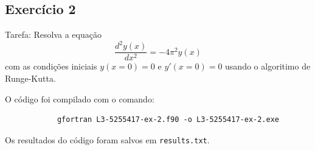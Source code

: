 \documentclass[12pt, a4paper]{article} %
\begin{document}
    \subsection{Exerc\'icio 2}

        Tarefa: Resolva a equa\c{c}\~ao
        \begin{equation*}
            \frac{d^{2}y(x)}{dx^{2}} = -4\pi^{2}y(x)
        \end{equation*}
        com as condi\c{c}\~oes iniciais $y(x=0) = 0$ e $y'(x=0) = 0$ usando o algoritimo de Runge-Kutta.


        O c\'odigo foi compilado com o comando:
        \begin{verbatim}
            gfortran L3-5255417-ex-2.f90 -o L3-5255417-ex-2.exe
        \end{verbatim}

        Os resultados do c\'odigo foram salvos em \texttt{results.txt}.
\end{document}
